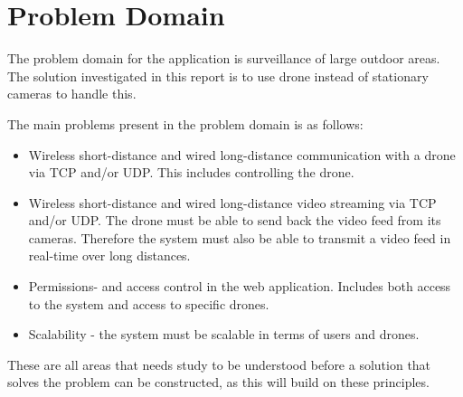\section{Problem Domain}
The problem domain for the application is surveillance of large outdoor areas.
The solution investigated in this report is to use drone instead of stationary cameras to handle this.

The main problems present in the problem domain is as follows:
\begin{itemize}
	\item Wireless short-distance and wired long-distance communication with a drone via TCP and/or UDP. This includes controlling the drone.
	\item Wireless short-distance and wired long-distance video streaming via TCP and/or UDP. The drone must be able to send back the video feed from its cameras. Therefore the system must also be able to transmit a video feed in real-time over long distances. 
	\item Permissions- and access control in the web application. Includes both access to the system and access to specific drones.
	\item Scalability - the system must be scalable in terms of users and drones.
\end{itemize}

These are all areas that needs study to be understood before a solution that solves the problem can be constructed, as this will build on these principles.
